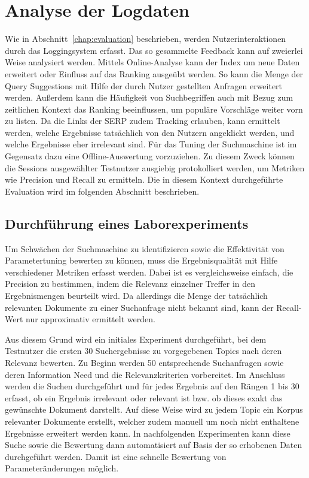 \section{Analyse der Logdaten}
\label{chap:log_analysis}

Wie in Abschnitt~\ref{chap:evaluation} beschrieben,
werden Nutzerinteraktionen durch das Loggingsystem erfasst.
Das so gesammelte Feedback kann auf zweierlei Weise analysiert werden.
Mittels Online-Analyse kann der Index um neue Daten erweitert oder Einfluss auf das Ranking ausgeübt werden.
So kann die Menge der Query Suggestions mit Hilfe der durch Nutzer gestellten Anfragen erweitert werden.
Außerdem kann die Häufigkeit von Suchbegriffen auch mit Bezug zum zeitlichen Kontext das Ranking beeinflussen,
um populäre Vorschläge weiter vorn zu listen.
Da die Links der SERP zudem Tracking erlauben, kann ermittelt werden,
welche Ergebnisse tatsächlich von den Nutzern angeklickt werden, und welche Ergebnisse eher irrelevant sind.
Für das Tuning der Suchmaschine ist im Gegensatz dazu eine Offline-Auswertung vorzuziehen.
Zu diesem Zweck können die Sessions ausgewählter Testnutzer ausgiebig protokolliert werden,
um Metriken wie Precision und Recall zu ermitteln.
Die in diesem Kontext durchgeführte Evaluation wird im folgenden Abschnitt beschrieben.

\subsection{Durchführung eines Laborexperiments}
\label{chap:labroratory_experiment}

Um Schwächen der Suchmaschine zu identifizieren sowie die Effektivität von Parametertuning bewerten zu können, muss die Ergebnisqualität mit Hilfe verschiedener Metriken erfasst werden. Dabei ist es vergleichsweise einfach, die Precision zu bestimmen, indem die Relevanz einzelner Treffer in den Ergebnismengen beurteilt wird. Da allerdings die Menge der tatsächlich relevanten Dokumente zu einer Suchanfrage nicht bekannt sind, kann der Recall-Wert nur approximativ ermittelt werden.

Aus diesem Grund wird ein initiales Experiment durchgeführt, bei dem Testnutzer die ersten 30 Suchergebnisse zu vorgegebenen Topics nach deren Relevanz bewerten. Zu Beginn werden 50 entsprechende Suchanfragen sowie deren Information Need und die Relevanzkriterien vorbereitet. Im Anschluss werden die Suchen durchgeführt und für jedes Ergebnis auf den Rängen 1 bis 30 erfasst, ob ein Ergebnis irrelevant oder relevant ist bzw. ob dieses exakt das gewünschte Dokument darstellt. Auf diese Weise wird zu jedem Topic ein Korpus relevanter Dokumente erstellt, welcher zudem manuell um noch nicht enthaltene Ergebnisse erweitert werden kann. In nachfolgenden Experimenten kann diese Suche sowie die Bewertung dann automatisiert auf Basis der so erhobenen Daten durchgeführt werden. Damit ist eine schnelle Bewertung von Parameteränderungen möglich.

